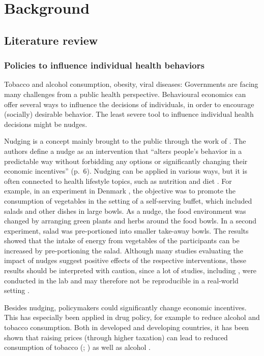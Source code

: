 \documentclass{scrbook}
\begin{document}
\chapter{Background}

\section{Literature review}

\subsection*{Policies to influence individual health behaviors}

Tobacco and alcohol consumption, obesity, viral diseases: Governments
are facing many challenges from a public health perspective. Behavioural
economics can offer several ways to influence the decisions of
individuals, in order to encourage (socially) desirable behavior. The
least severe tool to influence individual health decisions might be
nudges.

Nudging is a concept mainly brought to the public through the work of
\textcite{thaler_nudge_2008}. The authors define a nudge as an
intervention that ``alters people's behavior in a predictable way
without forbidding any options or significantly changing their economic
incentives'' (p.~6). Nudging can be applied in various ways, but it is
often connected to health lifestyle topics, such as nutrition and diet
\parencite{ledderer_nudging_2020}. For example, in an experiment in
Denmark \parencite{friis_comparison_2017}, the objective was to promote
the consumption of vegetables in the setting of a self-serving buffet,
which included salads and other dishes in large bowls. As a nudge, the
food environment was changed by arranging green plants and herbs around
the food bowls. In a second experiment, salad was pre-portioned into
smaller take-away bowls. The results showed that the intake of energy
from vegetables of the participants can be increased by pre-portioning
the salad. Although many studies evaluating the impact of nudges suggest
positive effects of the respective interventions, these results should
be interpreted with caution, since a lot of studies, including
\textcite{friis_comparison_2017}, were conducted in the lab and may
therefore not be reproducible in a real-world setting
\parencite{ledderer_nudging_2020}.

Besides nudging, policymakers could significantly change economic
incentives. This has especially been applied in drug policy, for example
to reduce alcohol and tobacco consumption. Both in developed and
developing countries, it has been shown that raising prices (through
higher taxation) can lead to reduced consumption of tobacco
(\cite{yeh_effects_2017}; \cite{immurana_effects_2021}) as well as
alcohol \parencite{daley_impact_2012}.
\end{document}
